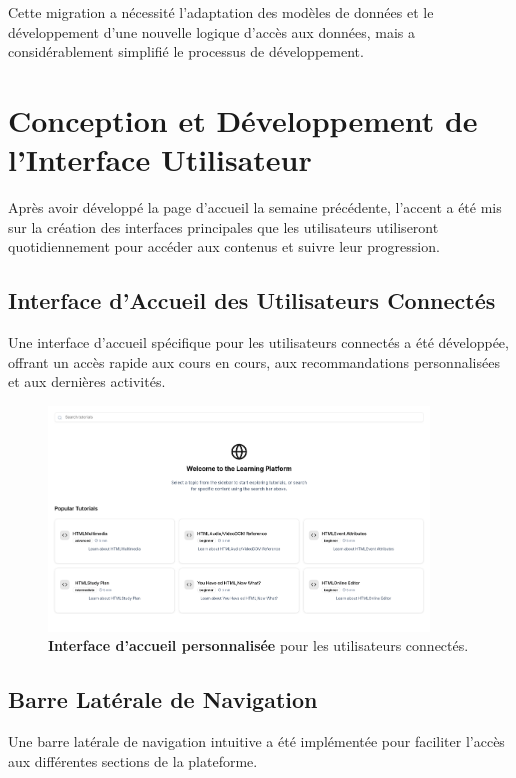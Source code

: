 Cette migration a nécessité l'adaptation des modèles de données et le développement d'une nouvelle logique d'accès aux données, mais a considérablement simplifié le processus de développement.

\section{Conception et Développement de l'Interface Utilisateur}

Après avoir développé la page d'accueil la semaine précédente, l'accent a été mis sur la création des interfaces principales que les utilisateurs utiliseront quotidiennement pour accéder aux contenus et suivre leur progression.

\subsection{Interface d'Accueil des Utilisateurs Connectés}

Une interface d'accueil spécifique pour les utilisateurs connectés a été développée, offrant un accès rapide aux cours en cours, aux recommandations personnalisées et aux dernières activités.

\begin{figure}[h!]
  \centering
  \includegraphics[width=0.9\textwidth,keepaspectratio]{week_3_img/accueil.png}
  \caption{\textbf{Interface d'accueil personnalisée} pour les utilisateurs connectés.}
  \label{fig:user_dashboard}
\end{figure}

\subsection{Barre Latérale de Navigation}

Une barre latérale de navigation intuitive a été implémentée pour faciliter l'accès aux différentes sections de la plateforme.

